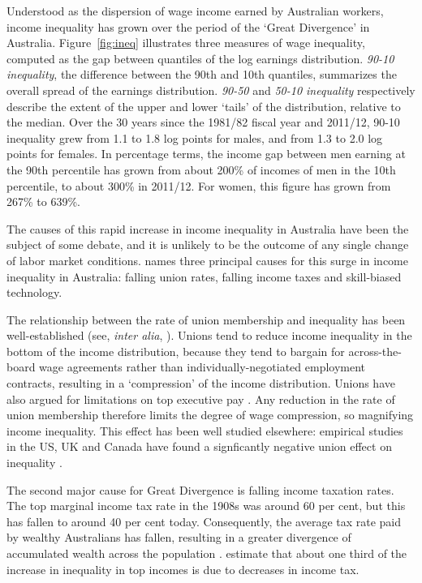 Understood as the dispersion of wage income earned by Australian workers, income inequality has grown over the period of the `Great Divergence' in Australia. Figure~\ref{fig:ineq} illustrates three measures of wage inequality, computed as the gap between quantiles of the log earnings distribution. {\em 90-10 inequality}, the difference between the 90th and 10th quantiles, summarizes the overall spread of the earnings distribution. {\em 90-50} and {\em 50-10 inequality} respectively describe the extent of the upper and lower `tails' of the distribution, relative to the median. Over the 30 years since the 1981/82 fiscal year and 2011/12, 90-10 inequality grew from 1.1 to 1.8 log points for males, and from 1.3 to 2.0 log points for females. In percentage terms, the income gap between men earning at the 90th percentile has grown from about 200\% of incomes of men in the 10th percentile, to about 300\% in 2011/12. For women, this figure has grown from 267\% to 639\%.


The causes of this rapid increase in income inequality in Australia have been the subject of some debate, and it is unlikely to be the outcome of any single change of labor market conditions. \citep{Leigh2013} names three principal causes for this surge in income inequality in Australia: falling union rates, falling income taxes and skill-biased technology. 

The relationship between the rate of union membership and inequality has been well-established (see, {\em inter alia}, \cite{Borland1996}).  Unions tend to reduce income inequality in the bottom of the income distribution, because they tend to bargain for across-the-board wage agreements rather than individually-negotiated employment contracts, resulting in a `compression' of the income distribution. Unions have also argued for limitations on top executive pay \citep{Davis2009}. Any reduction in the rate of union membership therefore limits the degree of wage compression, so magnifying income inequality. This effect has been well studied elsewhere: empirical studies in the US, UK and Canada have found a signficantly negative union effect on inequality \citep{Card2004,Firpo2009}. 

The second major cause for Great Divergence is falling income taxation rates. The top marginal income tax rate in the 1908s was around 60 per cent, but this has fallen to around 40 per cent today. Consequently, the average tax rate paid by wealthy Australians has fallen, resulting in a greater divergence of accumulated wealth across the population \citet[p31]{Leigh2013}. \citet{Atkinson2013} estimate that about one third of the increase in inequality in top incomes is due to decreases in income tax.

